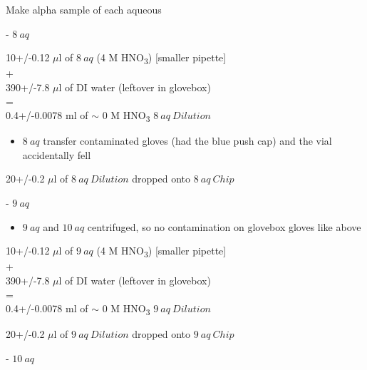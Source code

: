\documentclass[idxtotoc,hyperref,openany,oneside]{labbook} %
\newcommand{\cmark}{\ding{51}}%
\newcommand{\done}{\rlap{$\square$}{\raisebox{2pt}{\large\hspace{1pt}\cmark}}%
  \hspace{-2.5pt}}
\newcommand{\tsbs}{\textsubscript}
\begin{document}
\begin{todolist}

  
\item[\done]{Make alpha sample of each aqueous}
\begin{todolist}
\item[\done]{- $\boxed{8\ aq}$}
\end{todolist}
\begin{center}
10+/-0.12 $\mu$l of $\boxed{8\ aq}$ (4 M HNO\tsbs{3}) [smaller pipette]\\
+\\
390+/-7.8 $\mu$l of DI water (leftover in glovebox)\\
=\\
0.4+/-0.0078 ml of $\sim$ 0 M HNO\tsbs{3} $\boxed{8\ aq\ Dilution}$
\end{center}
\begin{itemize}
\item{$\boxed{8\ aq}$ transfer contaminated gloves (had the blue
  push cap) and the vial accidentally fell}
\end{itemize}
\vspace{0.3cm}
\begin{center}
  20+/-0.2 $\mu$l of $\boxed{8\ aq\ Dilution}$ dropped onto
  $\boxed{8\ aq\ Chip}$
\end{center}
\begin{todolist}
\item[\done]{- $\boxed{9\ aq}$}
  \begin{itemize}
  \item{$\boxed{9\ aq}$ and $\boxed{10\ aq}$ centrifuged, so
    no contamination on glovebox gloves like above}
  \end{itemize}
\end{todolist}
\begin{center}
10+/-0.12 $\mu$l of $\boxed{9\ aq}$ (4 M HNO\tsbs{3}) [smaller pipette]\\
+\\
390+/-7.8 $\mu$l of DI water (leftover in glovebox)\\
=\\
0.4+/-0.0078 ml of $\sim$ 0 M HNO\tsbs{3} $\boxed{9\ aq\ Dilution}$
\end{center}
\vspace{0.3cm}
\begin{center}
  20+/-0.2 $\mu$l of $\boxed{9\ aq\ Dilution}$ dropped onto
  $\boxed{9\ aq\ Chip}$
\end{center}
\begin{todolist}
\item[\done]{- $\boxed{10\ aq}$}

\end{todolist}
\end{todolist}
\end{document}
